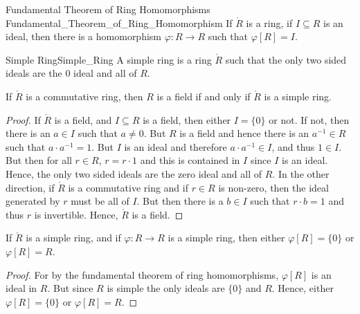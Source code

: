 \documentclass{book}                                                           %
\begin{document}
            \begin{ftheorem}{Fundamental Theorem of Ring Homomorphisms}
                            {Fundamental_Theorem_of_Ring_Homomorphism}
                If $\ring{R}$ is a ring, if $I\subseteq{R}$ is an ideal,
                then there is a homomorphism $\varphi:R\rightarrow{R}$ such
                that $\varphi[R]=I$.
            \end{ftheorem}
            \begin{fdefinition}{Simple Ring}{Simple_Ring}
                A simple ring is a ring $\ring{R}$ such that the only two
                sided ideals are the 0 ideal and all of $R$.
            \end{fdefinition}
            \begin{theorem}
                If $\ring{R}$ is a commutative ring, then $R$ is a field if
                and only if $\ring{R}$ is a simple ring.
            \end{theorem}
            \begin{proof}
                If $\ring{R}$ is a field, and $I\subseteq{R}$ is a field,
                then either $I=\{0\}$ or not. If not, then there is an
                $a\in{I}$ such that $a\ne{0}$. But $R$ is a field and hence
                there is an $a^{\minus{1}}\in{R}$ such that
                $a\cdot{a}^{\minus{1}}=1$. But $I$ is an ideal and therefore
                $a\cdot{a}^{\minus{1}}\in{I}$, and thus $1\in{I}$. But then
                for all $r\in{R}$, $r=r\cdot{1}$ and this is contained in
                $I$ since $I$ is an ideal. Hence, the only two sided ideals
                are the zero ideal and all of $R$. In the other direction,
                if $\ring{R}$ is a commutative ring and if $r\in{R}$ is
                non-zero, then the ideal generated by $r$ must be all of
                $I$. But then there is a $b\in{I}$ such that $r\cdot{b}=1$
                and thus $r$ is invertible. Hence, $\ring{R}$ is a field.
            \end{proof}
            \begin{theorem}
                If $\ring{R}$ is a simple ring, and if
                $\varphi:R\rightarrow{R}$ is a simple ring, then either
                $\varphi[R]=\{0\}$ or $\varphi[R]=R$.
            \end{theorem}
            \begin{proof}
                For by the fundamental theorem of ring homomorphisms,
                $\varphi[R]$ is an ideal in $R$. But since $R$ is simple
                the only ideals are $\{0\}$ and $R$. Hence, either
                $\varphi[R]=\{0\}$ or $\varphi[R]=R$.
            \end{proof}
\end{document}
